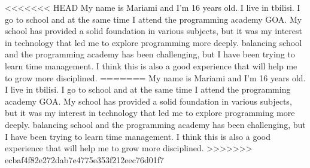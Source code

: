 <<<<<<< HEAD
My name is Mariami and I'm 16 years old. I live in tbilisi.
 I go to school and at the same time I attend the programming academy GOA. 
 My school has provided a solid foundation in various subjects, but it was my interest in technology that led me to
 explore programming more deeply. balancing school and the programming academy has been challenging, but I have been trying to learn time management.
 I think this is also a good experience that will help me to grow more disciplined.
=======
My name is Mariami and I'm 16 years old. I live in tbilisi. I go to school and at the same time I attend the programming academy GOA. My school has provided a solid foundation in various subjects, but it was my interest in technology that led me to explore programming more deeply. balancing school and the programming academy has been challenging, but I have been trying to learn time management. I think this is also a good experience that will help me to grow more disciplined.
>>>>>>> ecbaf4f82e272dab7e4775e353f212eec76d01f7
